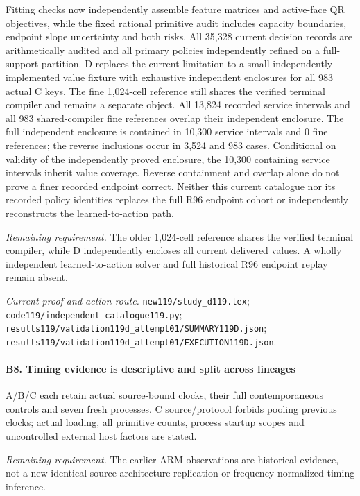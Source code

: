 Fitting checks now independently assemble feature matrices and active-face QR objectives, while the fixed rational primitive audit includes capacity boundaries, endpoint slope uncertainty and both risks. All 35,328 current decision records are arithmetically audited and all primary policies independently refined on a full-support partition. D replaces the current limitation to a small independently implemented value fixture with exhaustive independent enclosures for all 983 actual C keys. The fine 1,024-cell reference still shares the verified terminal compiler and remains a separate object. All 13,824 recorded service intervals and all 983 shared-compiler fine references overlap their independent enclosure. The full independent enclosure is contained in 10,300 service intervals and 0 fine references; the reverse inclusions occur in 3,524 and 983 cases. Conditional on validity of the independently proved enclosure, the 10,300 containing service intervals inherit value coverage. Reverse containment and overlap alone do not prove a finer recorded endpoint correct. Neither this current catalogue nor its recorded policy identities replaces the full R96 endpoint cohort or independently reconstructs the learned-to-action path.

\par\emph{Remaining requirement.} The older 1,024-cell reference shares the verified terminal compiler, while D independently encloses all current delivered values. A wholly independent learned-to-action solver and full historical R96 endpoint replay remain absent.

\par\emph{Current proof and action route.} \nolinkurl{new119/study_d119.tex}; \nolinkurl{code119/independent_catalogue119.py}; \nolinkurl{results119/validation119d_attempt01/SUMMARY119D.json}; \nolinkurl{results119/validation119d_attempt01/EXECUTION119D.json}.

\paragraph{B8. Timing evidence is descriptive and split across lineages}

A/\allowbreak{}B/\allowbreak{}C each retain actual source-bound clocks, their full contemporaneous controls and seven fresh processes. C source/\allowbreak{}protocol forbids pooling previous clocks; actual loading, all primitive counts, process startup scopes and uncontrolled external host factors are stated.

\par\emph{Remaining requirement.} The earlier ARM observations are historical evidence, not a new identical-source architecture replication or frequency-normalized timing inference.


